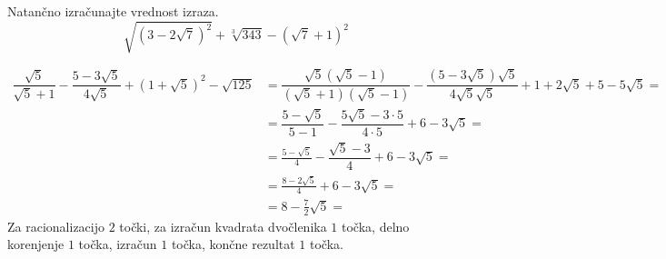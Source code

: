 \documentclass[addpoints]{exam}
\begin{document}
\begin{questions}


    \question[5]
    Natančno izračunajte vrednost izraza.
    $$ \sqrt{\left(3-2\sqrt{7}\right)^2}+\sqrt[3]{343}-\left(\sqrt{7}+1\right)^2 $$

    \begin{solution}[7cm]
        \begin{align*} 
            \dfrac{\sqrt{5}}{\sqrt{5}+1}-\dfrac{5-3\sqrt{5}}{4\sqrt{5}}+\left(1+\sqrt{5}\right)^2-\sqrt{125}&=\dfrac{\sqrt{5}(\sqrt{5}-1)}{(\sqrt{5}+1)(\sqrt{5}-1)}-\dfrac{(5-3\sqrt{5})\sqrt{5}}{4\sqrt{5}\sqrt{5}}+1+2\sqrt{5}+5-5\sqrt{5}= \\
                                                                                                            &=\dfrac{5-\sqrt{5}}{5-1}-\dfrac{5\sqrt{5}-3\cdot 5}{4\cdot 5}+6-3\sqrt{5}= \\
                                                                                                            &=\frac{5-\sqrt{5}}{4}-\dfrac{\sqrt{5}-3}{4}+6-3\sqrt{5}= \\
                                                                                                            &=\frac{8-2\sqrt{5}}{4}+6-3\sqrt{5}= \\
                                                                                                            &=8-\frac{7}{2}\sqrt{5}= 
        \end{align*}
        Za racionalizacijo $2$ točki, za izračun kvadrata dvočlenika $1$ točka, delno korenjenje $1$ točka, izračun $1$ točka, končne rezultat $1$ točka.
    \end{solution}
    
    

    
    


\end{questions}
\end{document}
